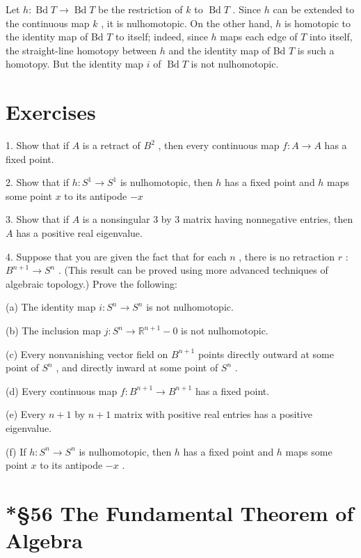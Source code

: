 \documentclass[10pt]{article}
\begin{document}
Let \(h : \operatorname{Bd}T \rightarrow  \operatorname{Bd}T\) be the restriction of \(k\) to \(\operatorname{Bd}T\) . Since \(h\) can be extended to the continuous map \(k\) , it is nulhomotopic. On the other hand, \(h\) is homotopic to the identity map of Bd \(T\) to itself; indeed, since \(h\) maps each edge of \(T\) into itself, the straight-line homotopy between \(h\) and the identity map of Bd \(T\) is such a homotopy. But the identity map \(i\) of \(\operatorname{Bd}T\) is not nulhomotopic.

\section*{Exercises}

1. Show that if \(A\) is a retract of \({B}^{2}\) , then every continuous map \(f : A \rightarrow  A\) has a fixed point.

2. Show that if \(h : {S}^{1} \rightarrow  {S}^{1}\) is nulhomotopic, then \(h\) has a fixed point and \(h\) maps some point \(x\) to its antipode \(- x\)

3. Show that if \(A\) is a nonsingular 3 by 3 matrix having nonnegative entries, then \(A\) has a positive real eigenvalue.

4. Suppose that you are given the fact that for each \(n\) , there is no retraction \(r\) : \({B}^{n + 1} \rightarrow  {S}^{n}\) . (This result can be proved using more advanced techniques of algebraic topology.) Prove the following:

(a) The identity map \(i : {S}^{n} \rightarrow  {S}^{n}\) is not nulhomotopic.

(b) The inclusion map \(j : {S}^{n} \rightarrow  {\mathbb{R}}^{n + 1} - 0\) is not nulhomotopic.

(c) Every nonvanishing vector field on \({B}^{n + 1}\) points directly outward at some point of \({S}^{n}\) , and directly inward at some point of \({S}^{n}\) .

(d) Every continuous map \(f : {B}^{n + 1} \rightarrow  {B}^{n + 1}\) has a fixed point.

(e) Every \(n + 1\) by \(n + 1\) matrix with positive real entries has a positive eigenvalue.

(f) If \(h : {S}^{n} \rightarrow  {S}^{n}\) is nulhomotopic, then \(h\) has a fixed point and \(h\) maps some point \(x\) to its antipode \(- x\) .

\section*{*§56 The Fundamental Theorem of Algebra}
\end{document}
